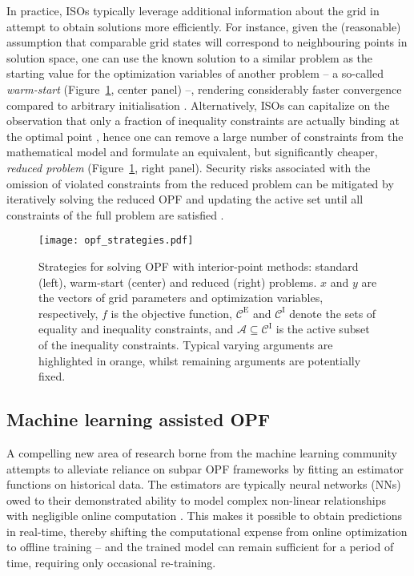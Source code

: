 \documentclass[journal]{IEEEtran}
\begin{document}
In practice, ISOs typically leverage additional information about the grid in attempt to obtain solutions more efficiently. For instance, given the (reasonable) assumption that comparable grid states will correspond to neighbouring points in solution space, one can use the known solution to a similar problem as the starting value for the optimization variables of another problem -- a so-called \emph{warm-start} (Figure~\ref{fig:ml_opf_strategies}, center panel) --, rendering considerably faster convergence compared to arbitrary initialisation \cite{Shahzad2010}. Alternatively, ISOs can capitalize on the observation that only a fraction of inequality constraints are actually binding at the optimal point \cite{Zhou2011}, hence one can remove a large number of constraints from the mathematical model and formulate an equivalent, but significantly cheaper, \emph{reduced problem} \cite{Roald2019} (Figure~\ref{fig:ml_opf_strategies}, right panel). Security risks associated with the omission of violated constraints from the reduced problem can be mitigated by iteratively solving the reduced OPF and updating the active set until all constraints of the full problem are satisfied \cite{Xingwang2009}.

\begin{figure}[!ht]
    \centerline{\texttt{[image: opf\_strategies.pdf]}}
    \caption{Strategies for solving OPF with interior-point methods: standard (left), warm-start (center) and reduced (right) problems. $x$ and $y$ are the vectors of grid parameters and optimization variables, respectively, $f$ is the objective function, $\mathcal{C}^{\mathrm{E}}$ and $\mathcal{C}^{\mathrm{I}}$ denote the sets of equality and inequality constraints, and $\mathcal{A} \subseteq \mathcal{C}^{\mathrm{I}}$ is the active subset of the inequality constraints. Typical varying arguments are highlighted in orange, whilst remaining arguments are potentially fixed.}
    \label{fig:ml_opf_strategies}
\end{figure}

\subsection{Machine learning assisted OPF}
A compelling new area of research borne from the machine learning community attempts to alleviate reliance on subpar OPF frameworks by fitting an estimator functions on historical data. The estimators are typically neural networks (NNs) owed to their demonstrated ability to model complex non-linear relationships with negligible online computation \cite{LeCun2015}. This makes it possible to obtain predictions in real-time, thereby shifting the computational expense from online optimization to offline training -- and the trained model can remain sufficient for a period of time, requiring only occasional re-training.
\end{document}

